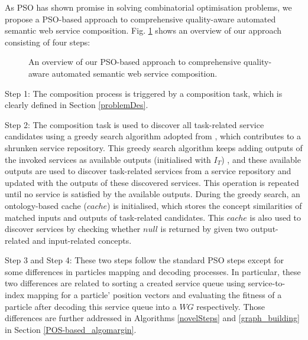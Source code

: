 As PSO has shown promise in solving combinatorial optimisation problems, we propose a PSO-based approach to comprehensive quality-aware automated semantic web service composition. Fig. \ref{overview} shows an overview of our approach consisting of four steps: 
\begin{figure}[h]
\centering
{}
 \caption{An overview of our PSO-based approach to comprehensive quality-aware automated semantic web service composition.}
 \label{overview}
\end{figure}

Step 1: The composition process is triggered by a composition task, which is clearly defined in Section \ref{problemDes}. 

Step 2: The composition task is used to discover all task-related service candidates using a greedy search algorithm adopted from \cite{ma2015hybrid}, which contributes to a shrunken service repository. This greedy search algorithm keeps adding outputs of the invoked services as available outputs (initialised with $I_{T}$) , and these available outputs are used to discover task-related services from a service repository and updated with the outputs of these discovered services. This operation is repeated until no service is satisfied by the available outputs. During the greedy search, an ontology-based cache ($cache$) is initialised, which stores the concept similarities of matched inputs and outputs of task-related candidates. This $cache$ is also used to discover services by checking whether $null$ is returned by given two output-related and input-related concepts.

Step 3 and Step 4: These two steps follow the standard PSO steps \cite{shi2001particle} except for some differences in particles mapping and decoding processes. In particular, these two differences are related to sorting a created service queue using service-to-index mapping for a particle' position vectors and evaluating the fitness of a particle after decoding this service queue into a $WG$ respectively. Those differences are further addressed in Algorithms \ref{novelSteps} and \ref{graph_building} in Section \ref{POS-based_algomargin}.



